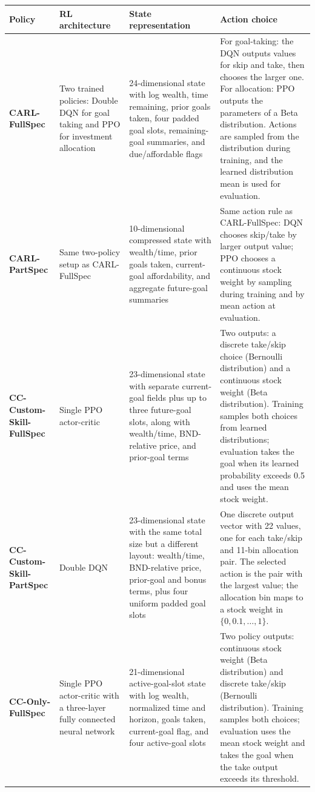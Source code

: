 \documentclass[mnsc,sglanonrev]{informs4}
\begin{document}
\begin{APPENDICES}
\begin{table}[H]
\centering
\footnotesize
\renewcommand{\arraystretch}{1.16}
\begin{tabular}{@{}p{}p{}p{}p{}@{}}
\toprule
\textbf{Policy} & \textbf{RL architecture} & \textbf{State representation} & \textbf{Action choice}\\
\midrule
\textbf{CARL-FullSpec} & Two trained policies: Double DQN for goal taking and PPO for investment allocation & 24-dimensional state with log wealth, time remaining, prior goals taken, four padded goal slots, remaining-goal summaries, and due/affordable flags & For goal-taking: the DQN outputs values for skip and take, then chooses the larger one. For allocation: PPO outputs the parameters of a Beta distribution. Actions are sampled from the distribution during training, and the learned distribution mean is used for evaluation.\\
\textbf{CARL-PartSpec} & Same two-policy setup as CARL-FullSpec & 10-dimensional compressed state with wealth/time, prior goals taken, current-goal affordability, and aggregate future-goal summaries & Same action rule as CARL-FullSpec: DQN chooses skip/take by larger output value; PPO chooses a continuous stock weight by sampling during training and by mean action at evaluation.\\
\textbf{CC-Custom-Skill-FullSpec} & Single PPO actor-critic & 23-dimensional state with separate current-goal fields plus up to three future-goal slots, along with wealth/time, BND-relative price, and prior-goal terms & Two outputs: a discrete take/skip choice (Bernoulli distribution) and a continuous stock weight (Beta distribution). Training samples both choices from learned distributions; evaluation takes the goal when its learned probability exceeds 0.5 and uses the mean stock weight.\\
\textbf{CC-Custom-Skill-PartSpec} & Double DQN & 23-dimensional state with the same total size but a different layout: wealth/time, BND-relative price, prior-goal and bonus terms, plus four uniform padded goal slots & One discrete output vector with 22 values, one for each take/skip and 11-bin allocation pair. The selected action is the pair with the largest value; the allocation bin maps to a stock weight in $\{0,0.1,\ldots,1\}$. \\
\textbf{CC-Only-FullSpec} & Single PPO actor-critic with a three-layer fully connected neural network & 21-dimensional active-goal-slot state with log wealth, normalized time and horizon, goals taken, current-goal flag, and four active-goal slots & Two policy outputs: continuous stock weight (Beta distribution) and discrete take/skip (Bernoulli distribution). Training samples both choices; evaluation uses the mean stock weight and takes the goal when the take output exceeds its threshold.\\

\end{tabular}
\end{table}
\end{APPENDICES}
\end{document}
